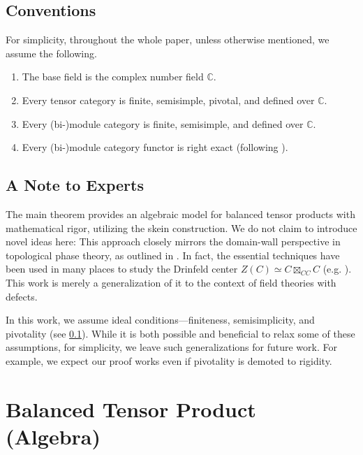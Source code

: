 \subsection{Conventions}\label{subsection/conventions}

For simplicity, throughout the whole paper, unless otherwise mentioned, we assume the following.
\begin{enumerate}
  \item The base field is the complex number field $\mathbb{C}$.
  \item Every tensor category is finite, semisimple, pivotal, and defined over $\mathbb{C}$.
  \item Every (bi-)module category is finite, semisimple, and defined over
  $\mathbb{C}$.
  \item Every (bi-)module category functor is right exact (following
        \cite{douglas/balanced-product}).
\end{enumerate}

\subsection{A Note to Experts}\label{subsection/a-note-to-experts}

The main theorem provides an algebraic model for balanced tensor products with
mathematical rigor, utilizing the skein construction. We do not claim to
introduce novel ideas here: This approach closely mirrors the domain-wall
perspective in topological phase theory, as outlined in
\cite{kong/topological-order}. In fact, the essential techniques have been
used in many places to study the Drinfeld center
$Z(C) \simeq C \boxtimes_{CC} C$ (e.g. \cite{kirillov/string-net-tv}). This
work is merely a generalization of it to the context of field theories with
defects.

In this work, we assume ideal conditions—finiteness, semisimplicity, and
pivotality (see \ref{subsection/conventions}). While it is both possible and
beneficial to relax some of these assumptions, for simplicity, we leave such
generalizations for future work. For example, we expect our proof works even
if pivotality is demoted to rigidity.

\section{Balanced Tensor Product (Algebra)}\label{section/balanced-tensor-product}

